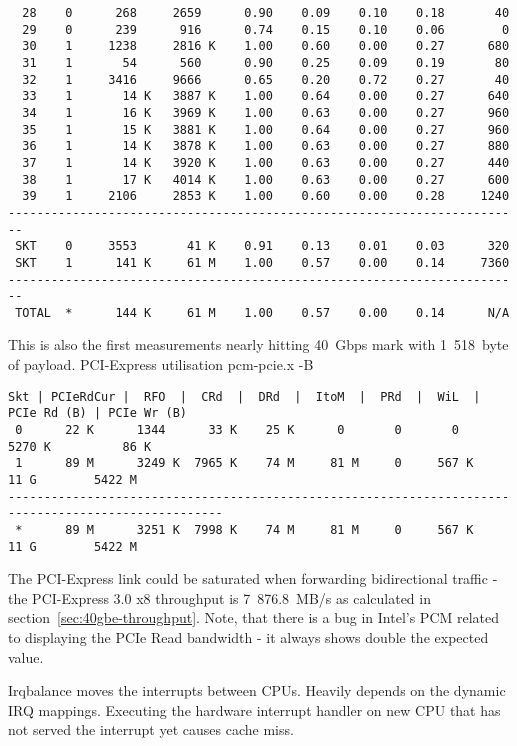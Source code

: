 \begin{lstlisting}
  28    0      268     2659      0.90    0.09    0.10    0.18       40
  29    0      239      916      0.74    0.15    0.10    0.06        0
  30    1     1238     2816 K    1.00    0.60    0.00    0.27      680
  31    1       54      560      0.90    0.25    0.09    0.19       80
  32    1     3416     9666      0.65    0.20    0.72    0.27       40
  33    1       14 K   3887 K    1.00    0.64    0.00    0.27      640
  34    1       16 K   3969 K    1.00    0.63    0.00    0.27      960
  35    1       15 K   3881 K    1.00    0.64    0.00    0.27      960
  36    1       14 K   3878 K    1.00    0.63    0.00    0.27      880
  37    1       14 K   3920 K    1.00    0.63    0.00    0.27      440
  38    1       17 K   4014 K    1.00    0.63    0.00    0.27      600
  39    1     2106     2853 K    1.00    0.60    0.00    0.28     1240
------------------------------------------------------------------------
 SKT    0     3553       41 K    0.91    0.13    0.01    0.03      320
 SKT    1      141 K     61 M    1.00    0.57    0.00    0.14     7360
------------------------------------------------------------------------
 TOTAL  *      144 K     61 M    1.00    0.57    0.00    0.14      N/A 
\end{lstlisting}


This is also the first measurements nearly hitting 40~Gbps mark with 1~518~byte of payload.
PCI-Express utilisation
pcm-pcie.x -B
\begin{lstlisting}
Skt | PCIeRdCur |  RFO  |  CRd  |  DRd  |  ItoM  |  PRd  |  WiL  | PCIe Rd (B) | PCIe Wr (B)
 0      22 K      1344      33 K    25 K      0       0       0          5270 K          86 K
 1      89 M      3249 K  7965 K    74 M     81 M     0     567 K          11 G        5422 M
----------------------------------------------------------------------------------------------------
 *      89 M      3251 K  7998 K    74 M     81 M     0     567 K          11 G        5422 M
\end{lstlisting}
The PCI-Express link could be saturated when forwarding bidirectional traffic
- the PCI-Express 3.0 x8 throughput is 7~876.8~MB/s as calculated in section~\ref{sec:40gbe-throughput}.
Note, that there is a bug in Intel's PCM related to displaying
the PCIe Read bandwidth - it always shows double the expected value.




Irqbalance moves the interrupts between CPUs.
Heavily depends on the dynamic IRQ mappings.
Executing the hardware interrupt handler on new CPU that has not served the interrupt yet causes cache miss.




